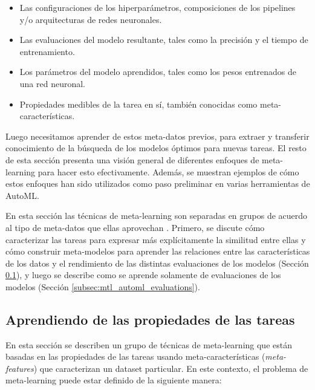 \begin{itemize}
	\item Las configuraciones de los hiperparámetros, composiciones de los pipelines y/o arquitecturas de redes neuronales.
	\item Las evaluaciones del modelo resultante, tales como la precisión y el tiempo de entrenamiento.
	\item Los parámetros del modelo aprendidos, tales como los pesos entrenados de una red neuronal.
	\item Propiedades medibles de la tarea en sí, también conocidas como meta-características.
\end{itemize}

Luego necesitamos aprender de estos meta-datos previos, para extraer y transferir conocimiento de la búsqueda de los modelos óptimos para nuevas tareas. El resto de esta sección presenta una visión general de diferentes enfoques de meta-learning para hacer esto efectivamente. Además, se muestran ejemplos de cómo estos enfoques han sido utilizados como paso preliminar en varias herramientas de AutoML.

En esta sección las técnicas de meta-learning son separadas en grupos de acuerdo al tipo de meta-datos que ellas aprovechan \cite{vanschoren2018metalearning}. Primero, se discute cómo caracterizar las tareas para expresar más explícitamente la similitud entre ellas y cómo construir meta-modelos para aprender las relaciones entre las características de los datos y el rendimiento de las distintas evaluaciones de los modelos (Sección \ref{subsec:mtl_automl_proprerties}), y luego se describe como se aprende solamente de evaluaciones de los modelos (Sección \ref{subsec:mtl_automl_evaluations}).

\subsection{Aprendiendo de las propiedades de las tareas}\label{subsec:mtl_automl_proprerties}


En esta sección se describen un grupo de técnicas de meta-learning que están basadas en las propiedades de las tareas usando meta-características (\textit{meta-features}) que caracterizan un dataset particular. En este contexto, el problema de meta-learning puede estar definido de la siguiente manera:

